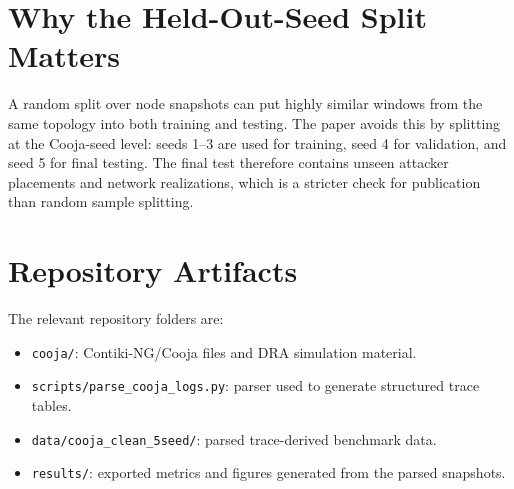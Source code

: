 \documentclass[10pt]{article}
\begin{document}
\section{Why the Held-Out-Seed Split Matters}
A random split over node snapshots can put highly similar windows from the same topology into both training and testing. The paper avoids this by splitting at the Cooja-seed level: seeds 1--3 are used for training, seed 4 for validation, and seed 5 for final testing. The final test therefore contains unseen attacker placements and network realizations, which is a stricter check for publication than random sample splitting.

\section{Repository Artifacts}
The relevant repository folders are:
\begin{itemize}[leftmargin=*]
\item \texttt{cooja/}: Contiki-NG/Cooja files and DRA simulation material.
\item \texttt{scripts/parse\_cooja\_logs.py}: parser used to generate structured trace tables.
\item \texttt{data/cooja\_clean\_5seed/}: parsed trace-derived benchmark data.
\item \texttt{results/}: exported metrics and figures generated from the parsed snapshots.
\end{itemize}
\end{document}
